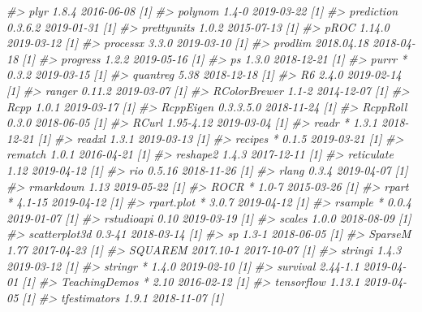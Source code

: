 \documentclass[]{krantz}
\makeatletter
\newenvironment{Shaded}{\begin{snugshade}}{\end{snugshade}}
\newcommand{\CommentTok}[1]{\textcolor[rgb]{0.37,0.37,0.37}{\textit{#1}}}
\newenvironment{kframe}{%
\medskip{}
\setlength{\fboxsep}{.8em}
 \def\at@end@of@kframe{}%
 \ifinner\ifhmode%
  \def\at@end@of@kframe{\end{minipage}}%
  \begin{minipage}{\columnwidth}%
 \fi\fi%
 \def\FrameCommand##1{\hskip\@totalleftmargin \hskip-\fboxsep
 \colorbox{shadecolor}{##1}\hskip-\fboxsep
     \hskip-\linewidth \hskip-\@totalleftmargin \hskip\columnwidth}%
 \MakeFramed {\advance\hsize-\width
   \@totalleftmargin\z@ \linewidth\hsize
   \@setminipage}}%
 {\par\unskip\endMakeFramed%
 \at@end@of@kframe}
\renewenvironment{Shaded}{\begin{kframe}}{\end{kframe}}
\makeatother
\begin{document}
\begin{Shaded}
\begin{Highlighting}[]
\CommentTok{#>    plyr            1.8.4      2016-06-08 [1]}
\CommentTok{#>    polynom         1.4-0      2019-03-22 [1]}
\CommentTok{#>    prediction      0.3.6.2    2019-01-31 [1]}
\CommentTok{#>    prettyunits     1.0.2      2015-07-13 [1]}
\CommentTok{#>    pROC            1.14.0     2019-03-12 [1]}
\CommentTok{#>    processx        3.3.0      2019-03-10 [1]}
\CommentTok{#>    prodlim         2018.04.18 2018-04-18 [1]}
\CommentTok{#>    progress        1.2.2      2019-05-16 [1]}
\CommentTok{#>    ps              1.3.0      2018-12-21 [1]}
\CommentTok{#>    purrr         * 0.3.2      2019-03-15 [1]}
\CommentTok{#>    quantreg        5.38       2018-12-18 [1]}
\CommentTok{#>    R6              2.4.0      2019-02-14 [1]}
\CommentTok{#>    ranger          0.11.2     2019-03-07 [1]}
\CommentTok{#>    RColorBrewer    1.1-2      2014-12-07 [1]}
\CommentTok{#>    Rcpp            1.0.1      2019-03-17 [1]}
\CommentTok{#>    RcppEigen       0.3.3.5.0  2018-11-24 [1]}
\CommentTok{#>    RcppRoll        0.3.0      2018-06-05 [1]}
\CommentTok{#>    RCurl           1.95-4.12  2019-03-04 [1]}
\CommentTok{#>    readr         * 1.3.1      2018-12-21 [1]}
\CommentTok{#>    readxl          1.3.1      2019-03-13 [1]}
\CommentTok{#>    recipes       * 0.1.5      2019-03-21 [1]}
\CommentTok{#>    rematch         1.0.1      2016-04-21 [1]}
\CommentTok{#>    reshape2        1.4.3      2017-12-11 [1]}
\CommentTok{#>    reticulate      1.12       2019-04-12 [1]}
\CommentTok{#>    rio             0.5.16     2018-11-26 [1]}
\CommentTok{#>    rlang           0.3.4      2019-04-07 [1]}
\CommentTok{#>    rmarkdown       1.13       2019-05-22 [1]}
\CommentTok{#>    ROCR          * 1.0-7      2015-03-26 [1]}
\CommentTok{#>    rpart         * 4.1-15     2019-04-12 [1]}
\CommentTok{#>    rpart.plot    * 3.0.7      2019-04-12 [1]}
\CommentTok{#>    rsample       * 0.0.4      2019-01-07 [1]}
\CommentTok{#>    rstudioapi      0.10       2019-03-19 [1]}
\CommentTok{#>    scales          1.0.0      2018-08-09 [1]}
\CommentTok{#>    scatterplot3d   0.3-41     2018-03-14 [1]}
\CommentTok{#>    sp              1.3-1      2018-06-05 [1]}
\CommentTok{#>    SparseM         1.77       2017-04-23 [1]}
\CommentTok{#>    SQUAREM         2017.10-1  2017-10-07 [1]}
\CommentTok{#>    stringi         1.4.3      2019-03-12 [1]}
\CommentTok{#>    stringr       * 1.4.0      2019-02-10 [1]}
\CommentTok{#>    survival        2.44-1.1   2019-04-01 [1]}
\CommentTok{#>    TeachingDemos * 2.10       2016-02-12 [1]}
\CommentTok{#>    tensorflow      1.13.1     2019-04-05 [1]}
\CommentTok{#>    tfestimators    1.9.1      2018-11-07 [1]}

\end{Highlighting}
\end{Shaded}
\end{document}
